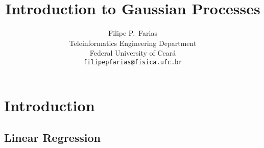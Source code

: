 \documentclass[11pt]{article} %
\title{Introduction to Gaussian Processes}
\author{
Filipe P.~Farias \\
Teleinformatics Engineering Department\\
Federal University of Ceará\\
\texttt{filipepfarias@fisica.ufc.br} \\
}
\begin{document}
\maketitle

\begin{abstract}
   \lipsum[1]
\end{abstract}

\section{Introduction}

\lipsum[1]%

\subsection{Linear Regression}


\lipsum[1]
\end{document}
